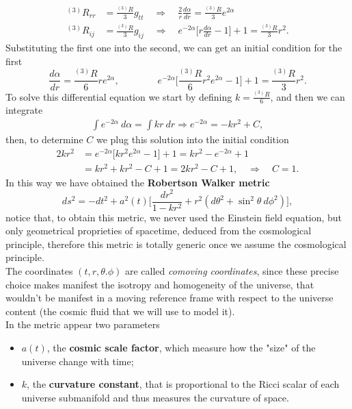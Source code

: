 \begin{align*}
    ^{(3)}R_{rr}&=\frac{^{(3)}R}{3}g_{tt}\quad\Rightarrow\quad\boxed{\frac{2}{r}\frac{d\alpha}{dr}=\frac{^{(3)}R}{3}e^{2\alpha}}\\ ^{(3)}R_{ij}&=\frac{^{(3)}R}{3}g_{ij}\quad\Rightarrow\quad \boxed{e^{-2\alpha}\bigg[r\frac{d\alpha}{dr}-1\bigg]+1=\frac{^{(3)}R}{3}r^2}.
\end{align*}
Substituting the first one into the second, we can get an initial condition for the first
\begin{equation}
    \frac{d\alpha}{dr}=\frac{^{(3)}R}{6}re^{2\alpha},\qquad\qquad e^{-2\alpha}\bigg[\frac{^{(3)}R}{6}r^2e^{2\alpha}-1\bigg]+1=\frac{^{(3)}R}{3}r^2.
\end{equation}
To solve this differential equation we start by defining $k=\frac{^{(3)}R}{6}$, and then we can integrate
\begin{align}
    \int e^{-2\alpha}\ d\alpha=\int kr\ dr \Rightarrow e^{-2\alpha}=-kr^2+C,
\end{align}
then, to determine $C$ we plug this solution into the initial condition
\begin{align*}
    2kr^2&=e^{-2\alpha}\bigg[kr^2e^{2\alpha}-1\bigg]+1=kr^2-e^{-2\alpha}+1\\
       &=kr^2+kr^2-C+1=2kr^2-C+1,\quad \Rightarrow\quad C=1.
\end{align*}    
In this way we have obtained the \textbf{Robertson Walker metric}
\begin{equation}\label{RWMetric}
    ds^2=-dt^2+a^2(t)\bigg[\frac{dr^2}{1-kr^2}+r^2(d\theta^2+\sin^2\theta\ d\phi^2)\bigg],
\end{equation}
notice that, to obtain this metric, we never used the Einstein field equation, but only geometrical proprieties of spacetime, deduced from the cosmological principle, therefore this metric is totally generic once we assume the cosmological principle.\\
The coordinates $(t,r,\theta.\phi)$ are called \emph{comoving coordinates}, since these precise choice makes manifest the isotropy and homogeneity of the universe, that wouldn't be manifest in a moving reference frame with respect to the universe content (the cosmic fluid that we will use to model it).\\
In the metric appear two parameters
\begin{itemize}
    \item $a(t)$, the \textbf{cosmic scale factor}, which measure how the "size" of the universe change with time;
    \item $k$, the \textbf{curvature constant}, that is proportional to the Ricci scalar of each universe submanifold and thus measures the curvature of space.
\end{itemize}
